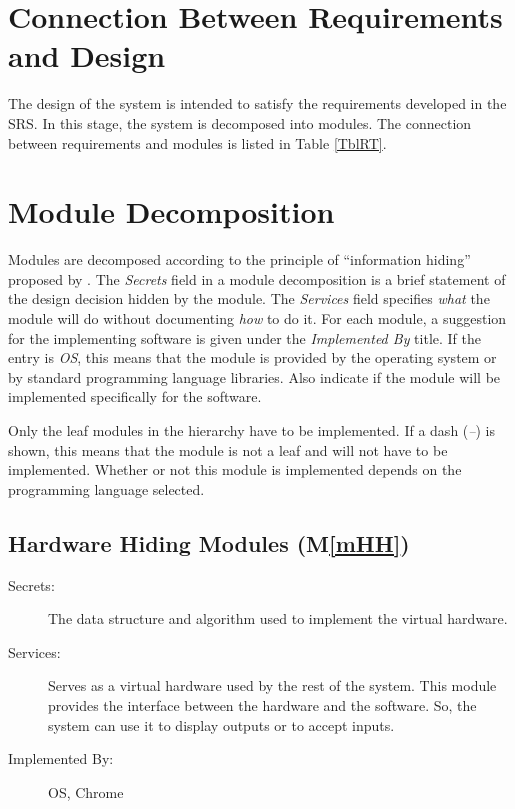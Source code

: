 \documentclass[12pt, titlepage]{article}
\newcommand{\mref}[1]{M\ref{#1}}
\begin{document}
\section{Connection Between Requirements and Design} \label{SecConnection}

The design of the system is intended to satisfy the requirements developed in
the SRS. In this stage, the system is decomposed into modules. The connection
between requirements and modules is listed in Table \ref{TblRT}.

\section{Module Decomposition} \label{SecMD}

Modules are decomposed according to the principle of ``information hiding''
proposed by \citet{ParnasEtAl1984}. The \emph{Secrets} field in a module
decomposition is a brief statement of the design decision hidden by the
module. The \emph{Services} field specifies \emph{what} the module will do
without documenting \emph{how} to do it. For each module, a suggestion for the
implementing software is given under the \emph{Implemented By} title. If the
entry is \emph{OS}, this means that the module is provided by the operating
system or by standard programming language libraries.  Also indicate if the
module will be implemented specifically for the software.

Only the leaf modules in the
hierarchy have to be implemented. If a dash (\emph{--}) is shown, this means
that the module is not a leaf and will not have to be implemented. Whether or
not this module is implemented depends on the programming language
selected.

\subsection{Hardware Hiding Modules (\mref{mHH})}

\begin{description}
\item[Secrets:]The data structure and algorithm used to implement the virtual
  hardware.
\item[Services:]Serves as a virtual hardware used by the rest of the
  system. This module provides the interface between the hardware and the
  software. So, the system can use it to display outputs or to accept inputs.
\item[Implemented By:] OS, Chrome
\end{description}
\end{document}
